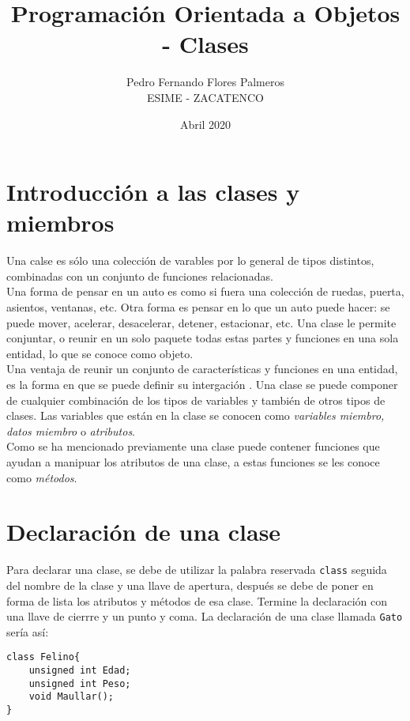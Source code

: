 \documentclass[12pt]{extarticle}
\title{Programación Orientada a Objetos - Clases}
\author{Pedro Fernando Flores Palmeros \\ ESIME - ZACATENCO}
\date{Abril 2020}
\newcommand{\<}{\langle}
\renewcommand{\>}{\rangle}
\theoremstyle{definition}
\begin{document}
\maketitle



\section{Introducción a las clases y miembros}

Una calse es sólo una colección de varables por lo general de tipos distintos, combinadas con un conjunto de funciones relacionadas.\\ 

Una forma de pensar en un auto es como si fuera una colección de ruedas, puerta, asientos, ventanas, etc. Otra forma es pensar en lo que un auto puede hacer: se puede mover, acelerar, desacelerar, detener, estacionar, etc. Una clase le permite conjuntar, o reunir en un solo paquete todas estas partes y funciones en una sola entidad, lo que se conoce como objeto.\\

Una ventaja de reunir un conjunto de características y funciones en una entidad, es la forma en que se puede definir su intergación . Una clase se puede componer de cualquier combinación de los tipos de variables y también de otros tipos de clases. Las variables que están en la clase se conocen como \textit{variables miembro, datos miembro} o \textit{atributos}.\\

Como se ha mencionado previamente una clase puede contener funciones que ayudan a manipuar los atributos de una clase, a estas funciones se les conoce como \textit{métodos}. \\


\section{Declaración de una clase}

Para declarar una clase, se debe de utilizar la palabra reservada \verb|class| seguida del nombre de la clase y una llave de apertura, después se debe de poner en forma de lista los atributos y métodos de esa clase. Termine la declaración con una llave de cierrre y un punto y coma. La declaración de una clase llamada \verb|Gato| sería así:

\begin{lstlisting}[label={lst::Prog01},caption={Declaración de una clase},captionpos=b]
class Felino{
	unsigned int Edad;
	unsigned int Peso;
	void Maullar();
}
\end{lstlisting}
\end{document}
